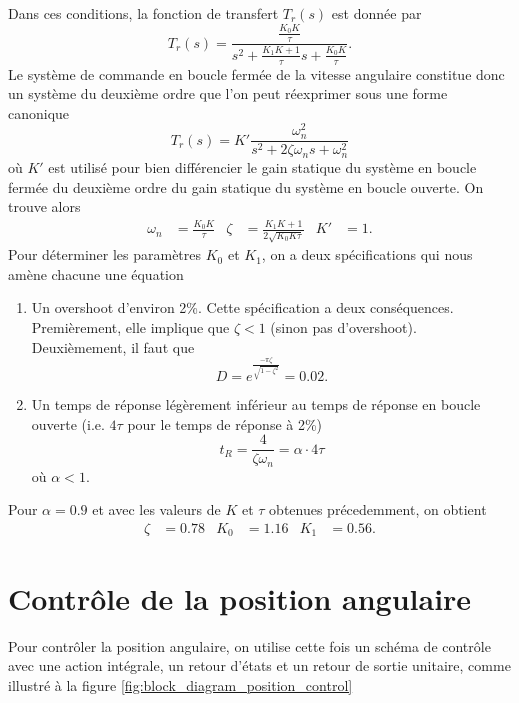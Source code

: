 \documentclass[frenchb, paper=a4, fontsize=11pt]{scrartcl}
\numberwithin{equation}{section}					%
\numberwithin{figure}{section}					%
\numberwithin{table}{section}						%
\begin{document}
Dans ces conditions, la fonction de transfert $T_r(s)$ est donnée
par
\begin{equation}
	T_r(s) = \frac{\frac{K_0K}{\tau}}{s^2 +\frac{K_1K+1}{\tau}s + \frac{K_0K}{\tau}}.
\end{equation}
Le système de commande en boucle fermée de la vitesse angulaire
constitue donc un système du deuxième ordre que l'on peut réexprimer
sous une forme canonique
\begin{equation}
	T_r(s) = K'\frac{\omega_n^2}{s^2 + 2\zeta\omega_n s+ \omega_n^2}
\end{equation}
où $K'$ est utilisé pour bien différencier le gain statique du système en
boucle fermée du deuxième ordre du gain statique du système en boucle
ouverte. On trouve alors
\begin{align}
	\omega_n & = \frac{K_0K}{\tau} & \zeta & = \frac{K_1K + 1}{2\sqrt{K_0K\tau}}
	& K' & = 1.
\end{align}
Pour déterminer les paramètres $K_0$ et $K_1$, on a deux spécifications
qui nous amène chacune une équation
\begin{enumerate}
	\item Un overshoot d'environ 2\%. Cette spécification a deux conséquences.
	Premièrement, elle implique que $\zeta < 1$ (sinon pas d'overshoot). Deuxièmement,
	il faut que
	\begin{equation}
		D = e^{\frac{-\pi\zeta}{\sqrt{1-\zeta^2}}} = 0.02.
	\end{equation}
	\item Un temps de réponse légèrement inférieur au temps de réponse en boucle
	ouverte (i.e. $4\tau$ pour le temps de réponse à 2\%)
	\begin{equation}
		t_R = \frac{4}{\zeta\omega_n} = \alpha \cdot 4\tau
	\end{equation}
	où $\alpha < 1$.
\end{enumerate}
Pour $\alpha = 0.9$ et avec les valeurs de $K$ et $\tau$ obtenues précedemment,
on obtient
\begin{align}
	\zeta & = 0.78 & K_0 & = 1.16 & K_1 & = 0.56.
\end{align}


\section{Contrôle de la position angulaire}
Pour contrôler la position angulaire, on utilise cette fois un schéma de contrôle
avec une action intégrale, un retour d'états et un retour de sortie unitaire,
comme illustré à la figure \ref{fig:block_diagram_position_control}
\end{document}
